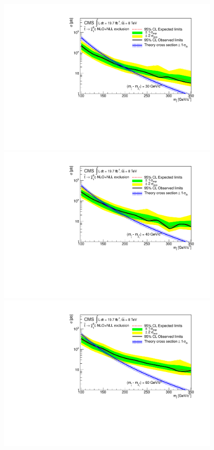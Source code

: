 \begin{figure}[!Hhtb]
\begin{center}
  \includegraphics[scale=0.39]{Figures/sus13009/limits/Limit30.pdf}
  \includegraphics[scale=0.39]{Figures/sus13009/limits/Limit40.pdf}
  \includegraphics[scale=0.39]{Figures/sus13009/limits/Limit60.pdf}

\end{center}
\end{figure}
